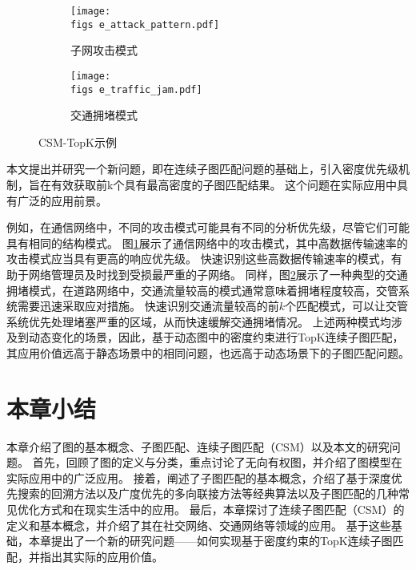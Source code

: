 \begin{figure}[h!]
    \def\wscorevone{0.49}
    \centering
        \begin{subfigure}[t]{\wscorevone\linewidth}
            \centering
            \resizebox{\linewidth}{!}
            {
                \texttt{[image: \\figs e\_attack\_pattern.pdf]}
            }
            \caption{子网攻击模式~\cite{static-topk-Gupta-DBLP:conf/icde/GuptaGYCH14}}
            \label{fig:example_attack_pattern}
        \end{subfigure}
        \hfill
        \begin{subfigure}[t]{\wscorevone\linewidth}
            \centering
            \resizebox{\linewidth}{!}
            {
                \texttt{[image: \\figs e\_traffic\_jam.pdf]}
            }
            \caption{交通拥堵模式~\cite{traffic-graph-matching-DBLP:journals/pvldb/SongGCW14}}
            \label{fig:example_traffic_jam}
        \end{subfigure}
        \label{fig:definition}
        \caption{CSM-TopK示例}
    \end{figure}


本文提出并研究一个新问题，即在连续子图匹配问题的基础上，引入密度优先级机制，旨在有效获取前k个具有最高密度的子图匹配结果。
这个问题在实际应用中具有广泛的应用前景。

例如，在通信网络中，不同的攻击模式可能具有不同的分析优先级，尽管它们可能具有相同的结构模式。
图\ref{fig:example_attack_pattern}展示了通信网络中的攻击模式\cite{static-topk-Gupta-DBLP:conf/icde/GuptaGYCH14}，其中高数据传输速率的攻击模式应当具有更高的响应优先级。
快速识别这些高数据传输速率的模式，有助于网络管理员及时找到受损最严重的子网络。
同样，图\ref{fig:example_traffic_jam}展示了一种典型的交通拥堵模式\cite{traffic-graph-matching-DBLP:journals/pvldb/SongGCW14}，在道路网络中，交通流量较高的模式通常意味着拥堵程度较高，交管系统需要迅速采取应对措施。
快速识别交通流量较高的前$k$个匹配模式，可以让交管系统优先处理堵塞严重的区域，从而快速缓解交通拥堵情况。
上述两种模式均涉及到动态变化的场景，因此，基于动态图中的密度约束进行TopK连续子图匹配，其应用价值远高于静态场景中的相同问题，也远高于动态场景下的子图匹配问题。

\section{本章小结}
本章介绍了图的基本概念、子图匹配、连续子图匹配（CSM）以及本文的研究问题。
首先，回顾了图的定义与分类，重点讨论了无向有权图，并介绍了图模型在实际应用中的广泛应用。
接着，阐述了子图匹配的基本概念，介绍了基于深度优先搜索的回溯方法以及广度优先的多向联接方法等经典算法以及子图匹配的几种常见优化方式和在现实生活中的应用。
最后，本章探讨了连续子图匹配（CSM）的定义和基本概念，并介绍了其在社交网络、交通网络等领域的应用。
基于这些基础，本章提出了一个新的研究问题——如何实现基于密度约束的TopK连续子图匹配，并指出其实际的应用价值。